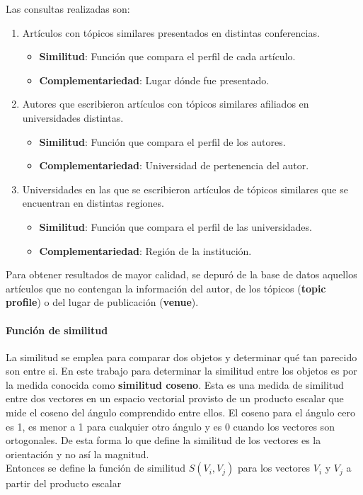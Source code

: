 Las consultas realizadas son:
\begin{enumerate}
	\item
		Artículos con tópicos similares presentados en distintas conferencias.
		\begin{itemize}
			\item \textbf{Similitud}: Función que compara el perfil de cada artículo.
			\item \textbf{Complementariedad}: Lugar dónde fue presentado.
		\end{itemize}

	\item
	Autores que escribieron artículos con tópicos similares afiliados en universidades distintas.
	\begin{itemize}
		\item \textbf{Similitud}: Función que compara el perfil de los autores.
		\item \textbf{Complementariedad}: Universidad de pertenencia del autor.
	\end{itemize}

	\item 
	Universidades en las que se escribieron artículos de tópicos similares que se encuentran en distintas regiones. 
	\begin{itemize}
		\item \textbf{Similitud}: Función que compara el perfil de las universidades.
		\item \textbf{Complementariedad}: Región de la institución.
	\end{itemize}
\end {enumerate}

Para obtener resultados de mayor calidad, se depuró de la base de datos aquellos artículos que no contengan la información del autor, de los tópicos (\textbf{topic profile}) o del lugar de publicación (\textbf{venue}). 

\paragraph{Función de similitud}
La similitud se emplea para comparar dos objetos y determinar qué tan parecido son entre si. En este trabajo para determinar la similitud entre los objetos es por la medida conocida como \textbf{similitud coseno}. Esta es una medida de similitud entre dos vectores en un espacio vectorial provisto de un producto escalar que mide el coseno del ángulo comprendido entre ellos. El coseno para el ángulo cero es 1, es menor a 1 para cualquier otro ángulo y es 0 cuando los vectores son ortogonales. De esta forma lo que define la similitud de los vectores es la orientación y no así la magnitud.\\
Entonces se define la función de similitud $S(V_i, V_j)$ para los vectores $V_i$ y $V_j$ a partir del producto escalar\\

